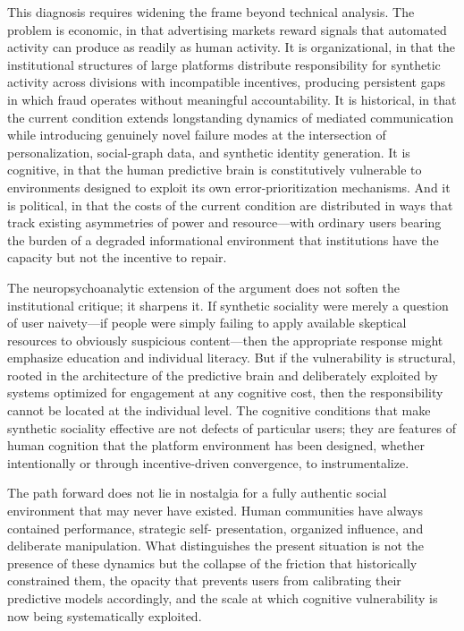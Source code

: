 \documentclass[12pt,a4paper]{article}
\begin{document}
This diagnosis requires widening the frame beyond technical analysis. The problem is economic,
in that advertising markets reward signals that automated activity can produce as readily as
human activity. It is organizational, in that the institutional structures of large platforms
distribute responsibility for synthetic activity across divisions with incompatible incentives,
producing persistent gaps in which fraud operates without meaningful accountability. It is
historical, in that the current condition extends longstanding dynamics of mediated communication
while introducing genuinely novel failure modes at the intersection of personalization,
social-graph data, and synthetic identity generation. It is cognitive, in that the human
predictive brain is constitutively vulnerable to environments designed to exploit its own
error-prioritization mechanisms. And it is political, in that the costs of the current condition
are distributed in ways that track existing asymmetries of power and resource---with ordinary
users bearing the burden of a degraded informational environment that institutions have the
capacity but not the incentive to repair.

The neuropsychoanalytic extension of the argument does not soften the institutional critique;
it sharpens it. If synthetic sociality were merely a question of user naivety---if people were
simply failing to apply available skeptical resources to obviously suspicious content---then
the appropriate response might emphasize education and individual literacy. But if the
vulnerability is structural, rooted in the architecture of the predictive brain and deliberately
exploited by systems optimized for engagement at any cognitive cost, then the responsibility
cannot be located at the individual level. The cognitive conditions that make synthetic sociality
effective are not defects of particular users; they are features of human cognition that the
platform environment has been designed, whether intentionally or through incentive-driven
convergence, to instrumentalize.

The path forward does not lie in nostalgia for a fully authentic social environment that may
never have existed. Human communities have always contained performance, strategic self-
presentation, organized influence, and deliberate manipulation. What distinguishes the present
situation is not the presence of these dynamics but the collapse of the friction that
historically constrained them, the opacity that prevents users from calibrating their
predictive models accordingly, and the scale at which cognitive vulnerability is now being
systematically exploited.
\end{document}
